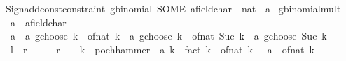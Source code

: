 \begin{isabellebody}
\isatagML
{}\isamarkupfalse%
\isanewline
\ \ {\isacartoucheopen}Sign{\isachardot}{\kern0pt}add{\isacharunderscore}{\kern0pt}const{\isacharunderscore}{\kern0pt}constraint\ {\isacharparenleft}{\kern0pt}\isactrlconstUNDERSCOREname {\isasymopen}gbinomial{\isasymclose}{\isacharcomma}{\kern0pt}\ SOME\ \isactrltyp {\isasymopen}{\isacharprime}{\kern0pt}a{\isacharcolon}{\kern0pt}{\isacharcolon}{\kern0pt}field{\isacharunderscore}{\kern0pt}char{\isacharunderscore}{\kern0pt}{}\ {\isasymRightarrow}\ nat\ {\isasymRightarrow}\ {\isacharprime}{\kern0pt}a{\isasymclose}{\isacharparenright}{\kern0pt}{\isacartoucheclose}%
\endisatagML
{\isafoldML}%
%
\isadelimML
\isanewline
%
\endisadelimML
\isanewline
{}\isamarkupfalse%
\ gbinomial{\isacharunderscore}{\kern0pt}mult{\isacharunderscore}{\kern0pt}{}{\isacharcolon}{\kern0pt}\isanewline
\ \ \ a\ {\isacharcolon}{\kern0pt}{\isacharcolon}{\kern0pt}\ {\isachardoublequoteopen}{\isacharprime}{\kern0pt}a{\isacharcolon}{\kern0pt}{\isacharcolon}{\kern0pt}field{\isacharunderscore}{\kern0pt}char{\isacharunderscore}{\kern0pt}{}{\isachardoublequoteclose}\isanewline
\ \ \ {\isachardoublequoteopen}a\ {\isacharasterisk}{\kern0pt}\ {\isacharparenleft}{\kern0pt}a\ gchoose\ k{\isacharparenright}{\kern0pt}\ {\isacharequal}{\kern0pt}\ of{\isacharunderscore}{\kern0pt}nat\ k\ {\isacharasterisk}{\kern0pt}\ {\isacharparenleft}{\kern0pt}a\ gchoose\ k{\isacharparenright}{\kern0pt}\ {\isacharplus}{\kern0pt}\ of{\isacharunderscore}{\kern0pt}nat\ {\isacharparenleft}{\kern0pt}Suc\ k{\isacharparenright}{\kern0pt}\ {\isacharasterisk}{\kern0pt}\ {\isacharparenleft}{\kern0pt}a\ gchoose\ {\isacharparenleft}{\kern0pt}Suc\ k{\isacharparenright}{\kern0pt}{\isacharparenright}{\kern0pt}{\isachardoublequoteclose}\isanewline
\ \ {\isacharparenleft}{\kern0pt}\ {\isachardoublequoteopen}{\isacharquery}{\kern0pt}l\ {\isacharequal}{\kern0pt}\ {\isacharquery}{\kern0pt}r{\isachardoublequoteclose}{\isacharparenright}{\kern0pt}\isanewline
%
\isadelimproof
%
\endisadelimproof
%
\isatagproof
{}\isamarkupfalse%
\ {\isacharminus}{\kern0pt}\isanewline
\ \ \isamarkupfalse%
\ {\isachardoublequoteopen}{\isacharquery}{\kern0pt}r\ {\isacharequal}{\kern0pt}\ {\isacharparenleft}{\kern0pt}{\isacharparenleft}{\kern0pt}{\isacharminus}{\kern0pt}\ {}{\isacharparenright}{\kern0pt}\ {\isacharcircum}{\kern0pt}k\ {\isacharasterisk}{\kern0pt}\ pochhammer\ {\isacharparenleft}{\kern0pt}{\isacharminus}{\kern0pt}\ a{\isacharparenright}{\kern0pt}\ k\ {\isacharslash}{\kern0pt}\ fact\ k{\isacharparenright}{\kern0pt}\ {\isacharasterisk}{\kern0pt}\ {\isacharparenleft}{\kern0pt}of{\isacharunderscore}{\kern0pt}nat\ k\ {\isacharminus}{\kern0pt}\ {\isacharparenleft}{\kern0pt}{\isacharminus}{\kern0pt}\ a\ {\isacharplus}{\kern0pt}\ of{\isacharunderscore}{\kern0pt}nat\ k{\isacharparenright}{\kern0pt}{\isacharparenright}{\kern0pt}{\isachardoublequoteclose}\isanewline

\end{isabellebody}
